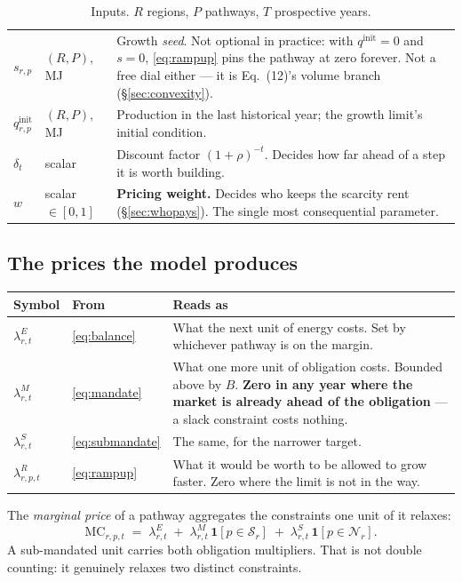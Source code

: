\documentclass[11pt,a4paper]{article}
\begin{document}
\begin{table}[h]
\begin{tabular}{@{}llp{8.3cm}@{}}
$s_{r,p}$ & $(R,P)$, MJ & Growth \emph{seed}. Not optional in practice: with
  $q^{\mathrm{init}} = 0$ and $s = 0$, \eqref{eq:rampup} pins the pathway at zero
  forever. Not a free dial either --- it is Eq.~(12)'s volume branch
  (\S\ref{sec:convexity}). \\
$q^{\mathrm{init}}_{r,p}$ & $(R,P)$, MJ & Production in the last historical year; the
  growth limit's initial condition. \\
$\delta_t$ & scalar & Discount factor $(1+\rho)^{-t}$. Decides how far ahead of a step
  it is worth building. \\
$w$ & scalar $\in [0,1]$ & \textbf{Pricing weight.} Decides who keeps the scarcity rent
  (\S\ref{sec:whopays}). The single most consequential parameter. \\
\bottomrule
\end{tabular}
\caption{Inputs. $R$ regions, $P$ pathways, $T$ prospective years.}
\end{table}

\subsection{The prices the model produces}

\begin{table}[h]
\centering\small
\begin{tabular}{@{}llp{9.2cm}@{}}
\toprule
\textbf{Symbol} & \textbf{From} & \textbf{Reads as} \\
\midrule
$\lambda^{E}_{r,t}$ & \eqref{eq:balance} & What the next unit of energy costs. Set by
  whichever pathway is on the margin. \\
$\lambda^{M}_{r,t}$ & \eqref{eq:mandate} & What one more unit of obligation costs.
  Bounded above by $B$. \textbf{Zero in any year where the market is already ahead of
  the obligation} --- a slack constraint costs nothing. \\
$\lambda^{S}_{r,t}$ & \eqref{eq:submandate} & The same, for the narrower target. \\
$\lambda^{R}_{r,p,t}$ & \eqref{eq:rampup} & What it would be worth to be allowed to grow
  faster. Zero where the limit is not in the way. \\
\bottomrule
\end{tabular}
\end{table}

\noindent The \emph{marginal price} of a pathway aggregates the constraints one unit of
it relaxes:
\begin{equation}
\mathrm{MC}_{r,p,t} \;=\; \lambda^{E}_{r,t}
  \;+\; \lambda^{M}_{r,t}\,\mathbf{1}[p \in \mathcal{S}_r]
  \;+\; \lambda^{S}_{r,t}\,\mathbf{1}[p \in \mathcal{N}_r].
\label{eq:marginal}
\end{equation}
A sub-mandated unit carries both obligation multipliers. That is not double counting: it
genuinely relaxes two distinct constraints.
\end{document}
